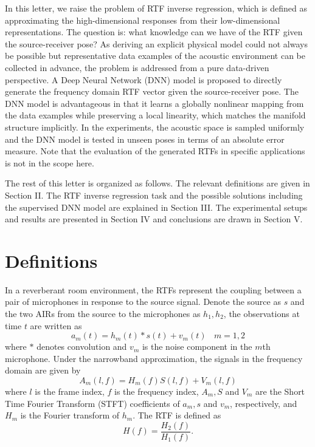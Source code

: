 \documentclass[journal]{IEEEtran}
\begin{document}
In this letter, we raise the problem of RTF inverse regression, which is defined as approximating the high-dimensional responses from their low-dimensional representations. The question is: what knowledge can we have of the RTF given the source-receiver pose? As deriving an explicit physical model could not always be possible but representative data examples of the acoustic environment can be collected in advance, the problem is addressed from a pure data-driven perspective. A Deep Neural Network (DNN) model is proposed to directly generate the frequency domain RTF vector given the source-receiver pose. The DNN model is advantageous in that it learns a globally nonlinear mapping from the data examples while preserving a local linearity, which matches the manifold structure implicitly. In the experiments, the acoustic space is sampled uniformly and the DNN model is tested in unseen poses in terms of an absolute error measure. Note that the evaluation of the generated RTFs in specific applications is not in the scope here.

The rest of this letter is organized as follows. The relevant definitions are given in Section II. The RTF inverse regression task and the possible solutions including the supervised DNN model are explained in Section III. The experimental setups and results are presented in Section IV and conclusions are drawn in Section V.

\section{Definitions}

In a reverberant room environment, the RTFs represent the coupling between a pair of microphones in response to the source signal. Denote the source as $s$ and the two AIRs from the source to the microphones as $h_1,h_2$, the observations at time $t$ are written as
\begin{equation}\label{eq1:sig}
  a_m(t) = h_m(t)*s(t) + v_m(t) ~~~~m=1,2
\end{equation}
where $*$ denotes convolution and $v_m$ is the noise component in the $m$th microphone. Under the narrowband approximation, the signals in the frequency domain are given by
\begin{equation}\label{eq1:sigfreq}
  A_m(l,f) = H_m(f)S(l,f) + V_m(l,f)
\end{equation}
where $l$ is the frame index, $f$ is the frequency index, $A_m,S$ and $V_m$ are the Short Time Fourier Transform (STFT) coefficients of $a_m, s$ and $v_m$, respectively, and $H_m$ is the Fourier transform of $h_m$. The RTF is defined as
\begin{equation}\label{eq:rtf}
  H(f)=\frac{H_2(f)}{H_1(f)}.
\end{equation}
\end{document}
